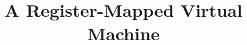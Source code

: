 \documentclass[A4]{sig-alternate}
\begin{document}
\setcounter{page}{1} %




\crdata{} %


\makeatletter
\def\@copyrightspace{
\@float{copyrightbox}[b]
\begin{center}
\setlength{\unitlength}{1pc}
\begin{picture}(20,7)         %
\put(0,-0.95){\crnotice{\@toappear}}
\end{picture}
\end{center}
\end@float}
\makeatother






\title{A Register-Mapped Virtual Machine}
%
%
%
%
%
\end{document}
